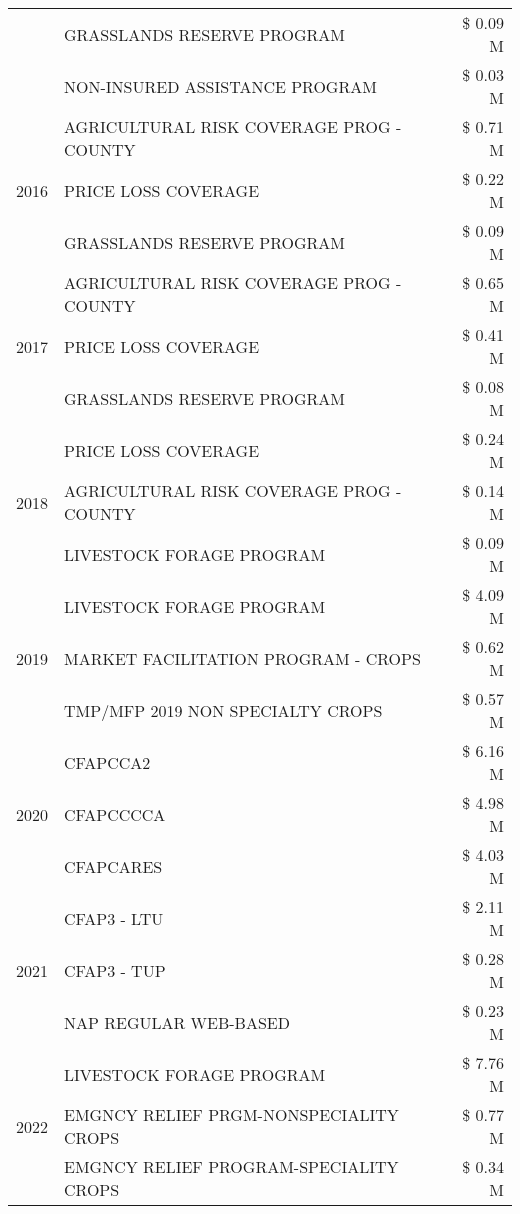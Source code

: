 \begin{tabular}{llr}
 & GRASSLANDS RESERVE PROGRAM & \$ 0.09 M \\
 & NON-INSURED ASSISTANCE PROGRAM & \$ 0.03 M \\
\cline{1-3}
\multirow[t]{3}{*}{2016} & AGRICULTURAL RISK COVERAGE PROG - COUNTY & \$ 0.71 M \\
 & PRICE LOSS COVERAGE & \$ 0.22 M \\
 & GRASSLANDS RESERVE PROGRAM & \$ 0.09 M \\
\cline{1-3}
\multirow[t]{3}{*}{2017} & AGRICULTURAL RISK COVERAGE PROG - COUNTY & \$ 0.65 M \\
 & PRICE LOSS COVERAGE & \$ 0.41 M \\
 & GRASSLANDS RESERVE PROGRAM & \$ 0.08 M \\
\cline{1-3}
\multirow[t]{3}{*}{2018} & PRICE LOSS COVERAGE & \$ 0.24 M \\
 & AGRICULTURAL RISK COVERAGE PROG - COUNTY & \$ 0.14 M \\
 & LIVESTOCK FORAGE PROGRAM & \$ 0.09 M \\
\cline{1-3}
\multirow[t]{3}{*}{2019} & LIVESTOCK FORAGE PROGRAM & \$ 4.09 M \\
 & MARKET FACILITATION PROGRAM - CROPS & \$ 0.62 M \\
 & TMP/MFP 2019 NON SPECIALTY CROPS & \$ 0.57 M \\
\cline{1-3}
\multirow[t]{3}{*}{2020} & CFAPCCA2 & \$ 6.16 M \\
 & CFAPCCCCA & \$ 4.98 M \\
 & CFAPCARES & \$ 4.03 M \\
\cline{1-3}
\multirow[t]{3}{*}{2021} & CFAP3 - LTU & \$ 2.11 M \\
 & CFAP3 - TUP & \$ 0.28 M \\
 & NAP REGULAR WEB-BASED & \$ 0.23 M \\
\cline{1-3}
\multirow[t]{3}{*}{2022} & LIVESTOCK FORAGE PROGRAM & \$ 7.76 M \\
 & EMGNCY RELIEF PRGM-NONSPECIALITY CROPS & \$ 0.77 M \\
 & EMGNCY RELIEF PROGRAM-SPECIALITY CROPS & \$ 0.34 M \\
\cline{1-3}
\bottomrule
\end{tabular}
